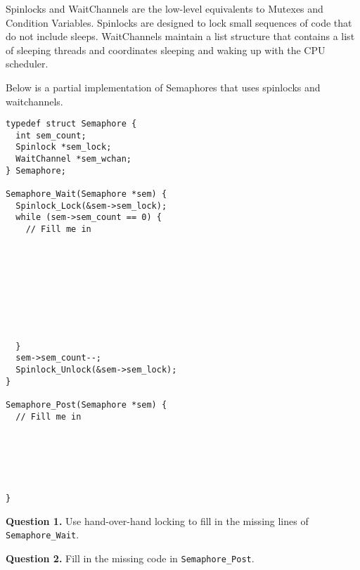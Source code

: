 \documentclass[letterpaper,twocolumn,10pt]{article}
\begin{document}
Spinlocks and WaitChannels are the low-level equivalents to Mutexes and 
Condition Variables.  Spinlocks are designed to lock small sequences of code 
that do not include sleeps.  WaitChannels maintain a list structure that 
contains a list of sleeping threads and coordinates sleeping and waking up with 
the CPU scheduler.

Below is a partial implementation of Semaphores that uses spinlocks and 
waitchannels.

\begin{lstlisting}[style=CStyle]
typedef struct Semaphore {
  int sem_count;
  Spinlock *sem_lock;
  WaitChannel *sem_wchan;
} Semaphore;

Semaphore_Wait(Semaphore *sem) {
  Spinlock_Lock(&sem->sem_lock);
  while (sem->sem_count == 0) {
    // Fill me in









  }
  sem->sem_count--;
  Spinlock_Unlock(&sem->sem_lock);
}

Semaphore_Post(Semaphore *sem) {
  // Fill me in






}
\end{lstlisting}

\break

\textbf{Question 1.} Use hand-over-hand locking to fill in the missing lines of 
\texttt{Semaphore\_Wait}.
\vspace{12em}

\textbf{Question 2.} Fill in the missing code in \texttt{Semaphore\_Post}.
\vspace{12em}
\end{document}
